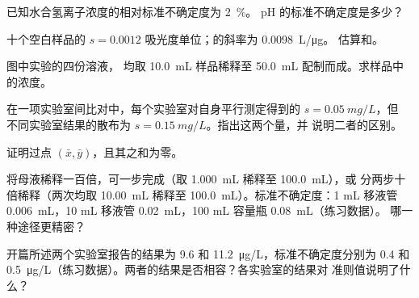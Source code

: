 \begin{exercise}[$\star\star$]\label{exo:b2:measurement-statistics:6}
已知水合氢离子浓度的相对标准不确定度为 2~\%。
pH 的标准不确定度是多少？
\end{exercise}

\begin{exercise}[$\star\star$]\label{exo:b2:measurement-statistics:7}
十个空白样品的 $s = 0.0012$ 吸光度单位；的斜率为 \qty{0.0098}{L/\micro g}。
估算和。
\end{exercise}

\begin{exercise}[$\star\star$]\label{exo:b2:measurement-statistics:8}
图中实验的四份溶液，
均取 \qty{10.0}{mL} 样品稀释至 \qty{50.0}{mL} 配制而成。求样品中的浓度。
\end{exercise}

\begin{exercise}[$\star\star$]\label{exo:b2:measurement-statistics:9}
在一项实验室间比对中，每个实验室对自身平行测定得到的 $s = \qty{0.05}{mg/L}$，但
不同实验室结果的散布为 $s = \qty{0.15}{mg/L}$。指出这两个量，并
说明二者的区别。
\end{exercise}

\begin{exercise}[$\star\star\star$]\label{exo:b2:measurement-statistics:10}
证明过点 $(\bar x, \bar y)$，且其之和为零。
\end{exercise}

\begin{exercise}[$\star\star\star$]\label{exo:b2:measurement-statistics:11}
将母液稀释一百倍，可一步完成（取 \qty{1.000}{mL} 稀释至 \qty{100.0}{mL}），或
分两步十倍稀释（两次均取 \qty{10.00}{mL} 稀释至 \qty{100.0}{mL}）。标准不确定度：1 mL
移液管 \qty{0.006}{mL}，10 mL 移液管 \qty{0.02}{mL}，100 mL 容量瓶 \qty{0.08}{mL}（练习数据）。
哪一种途径更精密？
\end{exercise}

\begin{exercise}[$\star\star\star$]\label{exo:b2:measurement-statistics:12}
开篇所述两个实验室报告的结果为 9.6 和 \qty{11.2}{\micro g/L}，标准不确定度分别为
0.4 和 \qty{0.5}{\micro g/L}（练习数据）。两者的结果是否相容？各实验室的结果对
准则值说明了什么？
\end{exercise}

